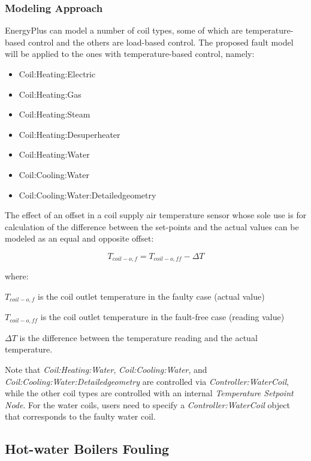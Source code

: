 \subsubsection{Modeling Approach}

EnergyPlus can model a number of coil types, some of which are temperature-based control and the others are load-based control. The proposed fault model will be applied to the ones with temperature-based control, namely:

\begin{itemize}
\tightlist
\item
  Coil:Heating:Electric
\item
  Coil:Heating:Gas
\item
  Coil:Heating:Steam
\item
  Coil:Heating:Desuperheater
\item
  Coil:Heating:Water
\item
  Coil:Cooling:Water
\item
  Coil:Cooling:Water:Detailedgeometry
\end{itemize}

The effect of an offset in a coil supply air temperature sensor whose sole use is for calculation of the difference between the set-points and the actual values can be modeled as an equal and opposite offset:

\begin{equation}
T_{coil-o,f} = T_{coil-o,ff} - \Delta T
\end{equation}

where:

\(T_{coil-o,f}\) is the coil outlet temperature in the faulty case (actual value)

\(T_{coil-o,ff}\) is the coil outlet temperature in the fault-free case (reading value)

\(\Delta T\) is the difference between the temperature reading and the actual temperature.

Note that \emph{Coil:Heating:Water}, \emph{Coil:Cooling:Water}, and \emph{Coil:Cooling:Water:Detailedgeometry} are controlled via \emph{Controller:WaterCoil}, while the other coil types are controlled with an internal \emph{Temperature Setpoint Node}. For the water coils, users need to specify a \emph{Controller:WaterCoil} object that corresponds to the faulty water coil.


\subsection{Hot-water Boilers Fouling}\label{hot-water-boiler-fouling}

